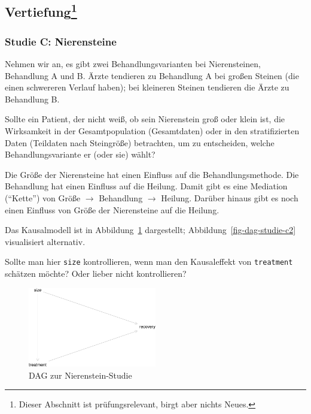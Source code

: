 \documentclass[
  a4paper,
  DIV=11]{scrreprt}
\theoremstyle{definition}
\theoremstyle{remark}
\begin{document}
\hypertarget{vertiefung-3}{%
\subsection[Vertiefung]{\texorpdfstring{Vertiefung\footnote{Dieser
  Abschnitt ist prüfungsrelevant, birgt aber nichts Neues.}}{Vertiefung}}\label{vertiefung-3}}

\hypertarget{studie-c-nierensteine}{%
\subsubsection{Studie C: Nierensteine}\label{studie-c-nierensteine}}

Nehmen wir an, es gibt zwei Behandlungsvarianten bei Nierensteinen,
Behandlung A und B. Ärzte tendieren zu Behandlung A bei großen Steinen
(die einen schwereren Verlauf haben); bei kleineren Steinen tendieren
die Ärzte zu Behandlung B.

Sollte ein Patient, der nicht weiß, ob sein Nierenstein groß oder klein
ist, die Wirksamkeit in der Gesamtpopulation (Gesamtdaten) oder in den
stratifizierten Daten (Teildaten nach Steingröße) betrachten, um zu
entscheiden, welche Behandlungsvariante er (oder sie) wählt?

Die Größe der Nierensteine hat einen Einfluss auf die
Behandlungsmethode. Die Behandlung hat einen Einfluss auf die Heilung.
Damit gibt es eine Mediation (``Kette'') von Größe \(\rightarrow\)
Behandlung \(\rightarrow\) Heilung. Darüber hinaus gibt es noch einen
Einfluss von Größe der Nierensteine auf die Heilung.

Das Kausalmodell ist in Abbildung~\ref{fig-dag-studie-c} dargestellt;
Abbildung~\ref{fig-dag-studie-c2} visualisiert alternativ.

Sollte man hier \texttt{size} kontrollieren, wenn man den Kausaleffekt
von \texttt{treatment} schätzen möchte? Oder lieber nicht kontrollieren?

\begin{figure}

{\centering \includegraphics[width=0.5\textwidth,height=\textheight]{./kausal_files/figure-pdf/fig-dag-studie-c-1.pdf}

}

\caption{\label{fig-dag-studie-c}DAG zur Nierenstein-Studie}

\end{figure}
\end{document}
